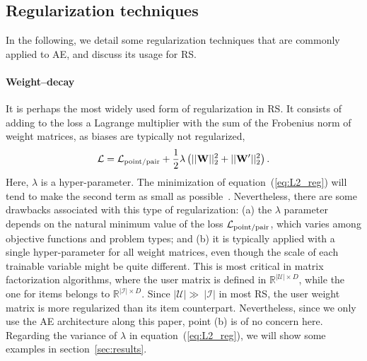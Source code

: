 \subsection{Regularization techniques}\label{subsec:model_regularizations}
In the following, we detail some regularization techniques that are commonly applied to AE, and discuss its usage for RS.
\paragraph{Weight--decay} It is perhaps the most widely used form of regularization in RS. 
It consists of adding to the loss a Lagrange multiplier with the sum of the Frobenius norm of weight matrices, as biases are typically not regularized,
\begin{equation}\label{eq:L2_reg}
\mathcal{L} = \mathcal{L}_{\rm point/pair}+\frac{1}{2}\lambda\left( ||{\bf W}||_2^2+||{\bf W'}||_2^2\right).
\end{equation}
Here, $\lambda$ is a hyper-parameter. 
The minimization of equation~(\ref{eq:L2_reg}) will tend to make the second term as small as possible~\cite{Goodfellow-et-al-2016}. 
Nevertheless, there are some drawbacks associated with this type of regularization: (a) the $\lambda$ parameter depends on the natural minimum value of the loss $\mathcal{L}_{\rm point/pair}$, which varies among objective functions and problem types; and (b) it is typically applied with a single hyper-parameter for all weight matrices, even though the scale of each trainable variable might be quite different. This is most critical in matrix factorization algorithms, where the user matrix is defined in $\mathbb{R}^{|\mathcal{U}|\times D}$, while the one for items belongs to $\mathbb{R}^{|\mathcal{I}|\times D}$. Since $|\mathcal{U}|\gg\ |\mathcal{I}|$ in most RS, the user weight matrix is more regularized than its item counterpart. Nevertheless, since we only use the AE architecture along this paper, point (b) is of no concern here. Regarding the variance of $\lambda$ in equation~(\ref{eq:L2_reg}), we will show some examples in section~\ref{sec:results}. 

